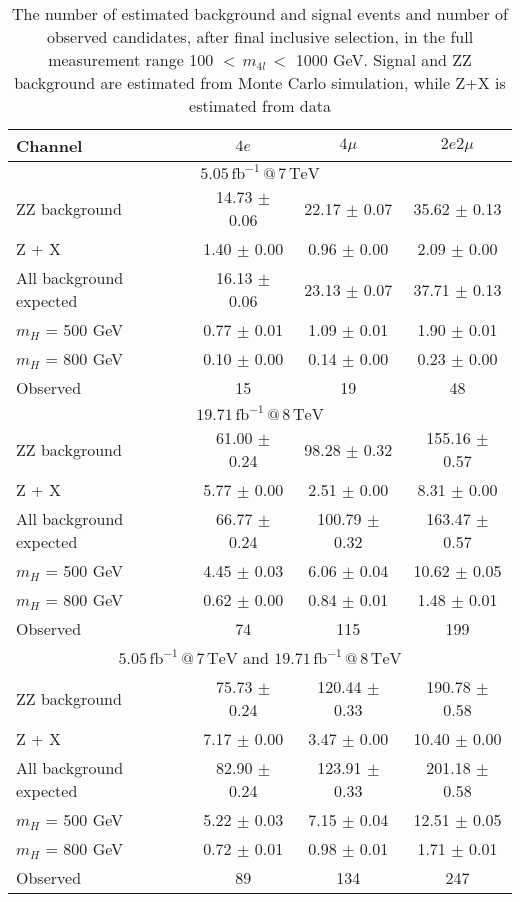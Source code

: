 \documentclass[a4paper,10pt]{article}
\begin{document}
 
\begin{table}
\caption{The number of estimated background and signal events and number of observed candidates, after final inclusive selection, in the full measurement range 100 $< \, m_{4l} \, <$ 1000 GeV. Signal and ZZ background are estimated from Monte Carlo simulation, while Z+X is estimated from data}
\begin{center}
\label{tab:EventYields}
\begin{tabular}{l|c|c|c}
\hline \hline
{\textbf{Channel}} & {\textbf{$4e$}} & {\textbf{$4\mu$}} & {\textbf{$2e2\mu$}} \\ 
\hline \hline
\multicolumn{4}{c}{$\mathrm{5.05 \, fb^{-1} \, @ \, 7 \, TeV}$}  \\ 
\hline
ZZ background & 14.73 $\pm$  0.06 & 22.17 $\pm$  0.07 & 35.62 $\pm$  0.13 \\
Z + X &  1.40 $\pm$  0.00 &  0.96 $\pm$  0.00 &  2.09 $\pm$  0.00 \\
\hline
All background expected & 16.13 $\pm$  0.06 & 23.13 $\pm$  0.07 & 37.71 $\pm$  0.13 \\
\hline
$m_H$ = 500 GeV &  0.77 $\pm$  0.01 &  1.09 $\pm$  0.01 &  1.90 $\pm$  0.01 \\
$m_H$ = 800 GeV &  0.10 $\pm$  0.00 &  0.14 $\pm$  0.00 &  0.23 $\pm$  0.00 \\
\hline
Observed & 15 & 19 & 48 \\
\hline \hline
\multicolumn{4}{c}{$\mathrm{19.71 \, fb^{-1} \, @ \, 8 \, TeV}$}  \\ 
\hline
ZZ background & 61.00 $\pm$  0.24 & 98.28 $\pm$  0.32 & 155.16 $\pm$  0.57 \\
Z + X &  5.77 $\pm$  0.00 &  2.51 $\pm$  0.00 &  8.31 $\pm$  0.00 \\
\hline
All background expected & 66.77 $\pm$  0.24 & 100.79 $\pm$  0.32 & 163.47 $\pm$  0.57 \\
\hline
$m_H$ = 500 GeV &  4.45 $\pm$  0.03 &  6.06 $\pm$  0.04 & 10.62 $\pm$  0.05 \\
$m_H$ = 800 GeV &  0.62 $\pm$  0.00 &  0.84 $\pm$  0.01 &  1.48 $\pm$  0.01 \\
\hline
Observed & 74 & 115 & 199 \\
\hline \hline
\multicolumn{4}{c}{$\mathrm{5.05 \, fb^{-1} \, @ \, 7 \, TeV}$ and $\mathrm{19.71 \, fb^{-1} \, @ \, 8 \, TeV}$}  \\
\hline
ZZ background & 75.73 $\pm$  0.24 & 120.44 $\pm$  0.33 & 190.78 $\pm$  0.58 \\
Z + X &  7.17 $\pm$  0.00 &  3.47 $\pm$  0.00 & 10.40 $\pm$  0.00 \\
\hline
All background expected & 82.90 $\pm$  0.24 & 123.91 $\pm$  0.33 & 201.18 $\pm$  0.58 \\
\hline
$m_H$ = 500 GeV &  5.22 $\pm$  0.03 &  7.15 $\pm$  0.04 & 12.51 $\pm$  0.05 \\
$m_H$ = 800 GeV &  0.72 $\pm$  0.01 &  0.98 $\pm$  0.01 &  1.71 $\pm$  0.01 \\
\hline
Observed & 89 & 134 & 247 \\
\hline \hline
\end{tabular}
\end{center}
\end{table}
 
\end{document}
